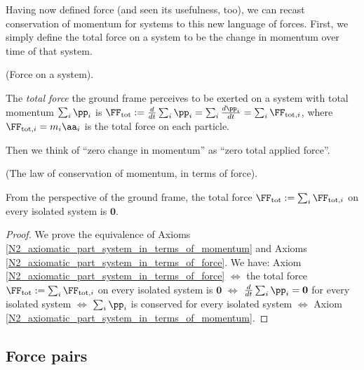 \documentclass{article}
\begin{document}
Having now defined force (and seen its usefulness, too), we can recast conservation of momentum for systems to this new language of forces. First, we simply define the total force on a system to be the change in momentum over time of that system.

\begin{defn}
	\label{N2_defn_part_system}
	(Force on a system).
	
	The \textit{total force} the ground frame perceives to be exerted on a system with total momentum $\sum_i \pp_i$ is $\FF_{\text{tot}} := \frac{d}{dt} \sum_i \pp_i = \sum_i \frac{d\pp_i}{dt} =  \sum_i \FF_{\text{tot}, i}$, where $\FF_{\text{tot}, i} = m_i \aa_i$ is the total force on each particle.
\end{defn}

Then we think of ``zero change in momentum'' as ``zero total applied force''.

\begin{axiom}
	\label{N2_axiomatic_part_system_in_terms_of_force}
	
	(The law of conservation of momentum, in terms of force).
	
	From the perspective of the ground frame, the total force $\FF_{\text{tot}} := \sum_i \FF_{\text{tot}, i}$ on every isolated system is $\mathbf{0}$.
\end{axiom}

\begin{proof}
	We prove the equivalence of Axioms \ref{N2_axiomatic_part_system_in_terms_of_momentum} and Axioms \ref{N2_axiomatic_part_system_in_terms_of_force}. We have: Axiom \ref{N2_axiomatic_part_system_in_terms_of_force} $\iff$ the total force $\FF_{\text{tot}} := \sum_i \FF_{\text{tot}, i}$ on every isolated system is $\mathbf{0}$ $\iff$ $\frac{d}{dt} \sum_i \pp_i = \mathbf{0}$ for every isolated system $\iff$ $\sum_i \pp_i$ is conserved for every isolated system $\iff$ Axiom \ref{N2_axiomatic_part_system_in_terms_of_momentum}. 
\end{proof}

\newpage

\subsection*{Force pairs}

\end{document}
